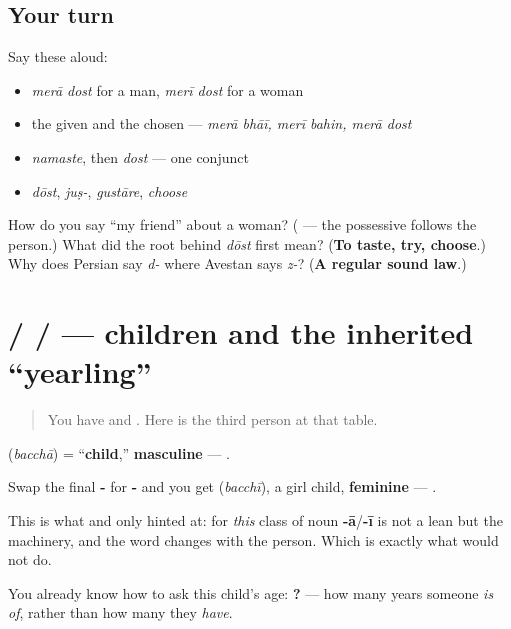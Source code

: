 \subsection*{Your turn}
Say these aloud:

\begin{itemize}
\raggedright
  \item \emph{merā dost} for a man, \emph{merī dost} for a woman
  \item the given and the chosen — \emph{merā bhāī, merī bahin, merā dost}
  \item \emph{namaste}, then \emph{dost} — one conjunct
  \item \emph{dōst}, \emph{juṣ-}, \emph{gustāre}, \emph{choose}
\end{itemize}

\begin{tcolorbox}[breakable,colback=teal!4,colframe=teal!35!black,title={Before you move on}]
How do you say \textquotedblleft{}my friend\textquotedblright{} about a woman? (\textbf{ } — the possessive follows the person.) What did the root behind \emph{dōst} first mean? (\textbf{To taste, try, choose}.) Why does Persian say \emph{d-} where Avestan says \emph{z-}? (\textbf{A regular sound law}.)
\end{tcolorbox}
\section[\texorpdfstring{\hi{बच्चा} / \hi{बच्ची} / \hi{बछड़ा} (bacchā / bacchī …)}{बच्चा / बच्ची / बछड़ा (bacchā / bacchī …)}]{ /  /  — children and the inherited \textquotedblleft{}yearling\textquotedblright{}}

\label{lesson:HI-C39-baccha}



\begin{quote}
You have \textbf{} and \textbf{}. Here is the third person at that table.
\end{quote}

\begin{grammarlens}[title={Grammar Lens: a pair you can see}]
\textbf{} (\emph{bacchā}) = \textquotedblleft{}\textbf{child},\textquotedblright{} \textbf{masculine} — \textbf{ }.

Swap the final \textbf{-} for \textbf{-} and you get \textbf{} (\emph{bacchī}), a girl child, \textbf{feminine} — \textbf{ }.

This is what \textbf{} and \textbf{} only hinted at: for \emph{this} class of noun \textbf{-ā}/\textbf{-ī} is not a lean but the machinery, and the word changes with the person. Which is exactly what \textbf{} would not do.

You already know how to ask this child's age: \textbf{   ?} — how many years someone \emph{is of}, rather than how many they \emph{have}.
\end{grammarlens}

